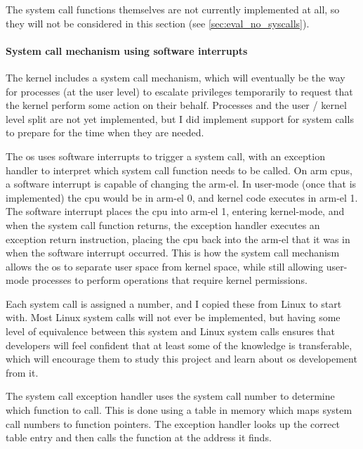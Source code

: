 \documentclass{article}
\begin{document}
The system call functions themselves are not currently implemented at all, so
they will not be considered in this section (see
\autoref{sec:eval_no_syscalls}).

\paragraph{System call mechanism using software interrupts}
The kernel includes a system call mechanism, which will eventually be the way
for processes (at the user level) to escalate privileges temporarily to request
that the kernel perform some action on their behalf. Processes and the user /
kernel level split are not yet implemented, but I did implement support for
system calls to prepare for the time when they are needed.

The \gls{os} uses software interrupts to trigger a system call, with an
exception handler to interpret which system call function needs to be called.
On \gls{arm} \glspl{cpu}, a software interrupt is capable of changing the
\gls{arm-el}. In user-mode (once that is implemented) the \gls{cpu} would be in
\gls{arm-el} 0, and kernel code executes in \gls{arm-el} 1. The software
interrupt places the \gls{cpu} into \gls{arm-el} 1, entering kernel-mode, and
when the system call function returns, the exception handler executes an
exception return instruction, placing the \gls{cpu} back into the \gls{arm-el}
that it was in when the software interrupt occurred. This is how the system
call mechanism allows the \gls{os} to separate user space from kernel space,
while still allowing user-mode processes to perform operations that require
kernel permissions.

Each system call is assigned a number, and I copied these from Linux to start
with. Most Linux system calls will not ever be implemented, but having some
level of equivalence between this system and Linux system calls ensures that
developers will feel confident that at least some of the knowledge is
transferable, which will encourage them to study this project and learn about
\gls{os} developement from it.

The system call exception handler uses the system call number to determine
which function to call. This is done using a table in memory which maps system
call numbers to function pointers. The exception handler looks up the correct
table entry and then calls the function at the address it finds.
\end{document}
